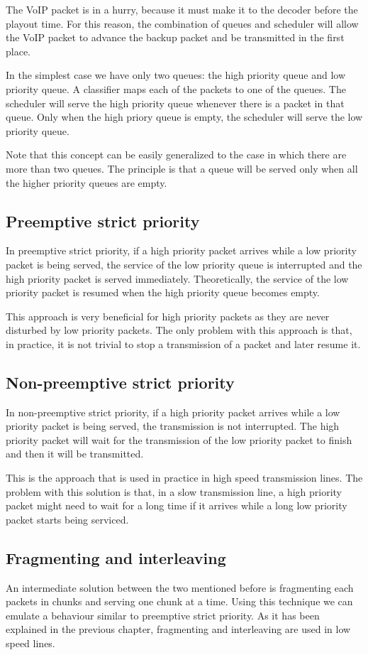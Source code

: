 The VoIP packet is in a hurry, because it must make it to the decoder before the playout time.
For this reason, the combination of queues and scheduler will allow the VoIP packet to advance the backup packet and be transmitted in the first place.

In the simplest case we have only two queues: the high priority queue and low priority queue.
A classifier maps each of the packets to one of the queues.
The scheduler will serve the high priority queue whenever there is a packet in that queue.
Only when the high priory queue is empty, the scheduler will serve the low priority queue.

Note that this concept can be easily generalized to the case in which there are more than two queues.
The principle is that a queue will be served only when all the higher priority queues are empty.

\subsection{Preemptive strict priority}
In preemptive strict priority, if a high priority packet arrives while a low priority packet is being served, the service of the low priority queue is interrupted and the high priority packet is served immediately.
Theoretically, the service of the low priority packet is resumed when the high priority queue becomes empty.

This approach is very beneficial for high priority packets as they are never disturbed by low priority packets.
The only problem with this approach is that, in practice, it is not trivial to stop a transmission of a packet and later resume it.

\subsection{Non-preemptive strict priority}
In non-preemptive strict priority, if a high priority packet arrives while a low priority packet is being served, the transmission is not interrupted.
The high priority packet will wait for the transmission of the low priority packet to finish and then it will be transmitted.

This is the approach that is used in practice in high speed transmission lines.
The problem with this solution is that, in a slow transmission line, a high priority packet might need to wait for a long time if it arrives while a long low priority packet starts being serviced.

\subsection{Fragmenting and interleaving}
An intermediate solution between the two mentioned before is fragmenting each packets in chunks and serving one chunk at a time. 
Using this technique we can emulate a behaviour similar to preemptive strict priority.
As it has been explained in the previous chapter, fragmenting and interleaving are used in low speed lines.

